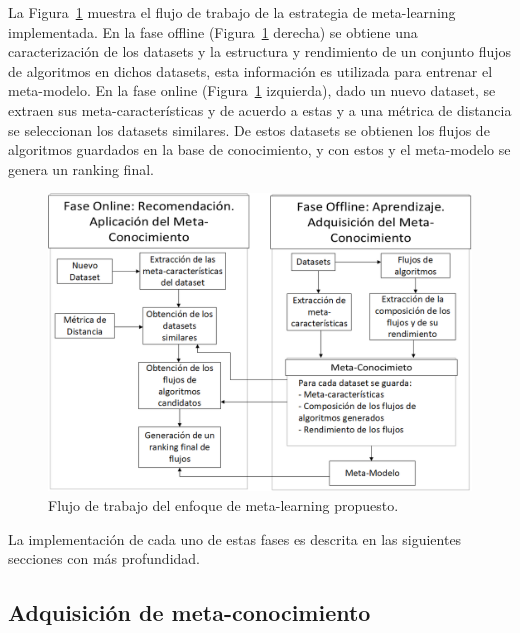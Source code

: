 La Figura~\ref{fig:system} muestra el flujo de trabajo de la estrategia de meta-learning implementada. En la fase offline (Figura~\ref{fig:system} derecha) se obtiene una caracterización de los datasets y la estructura y rendimiento de un conjunto flujos de algoritmos en dichos datasets, esta información es utilizada para entrenar el meta-modelo. En la fase online (Figura~\ref{fig:system} izquierda), dado un nuevo dataset, se extraen sus meta-características y de acuerdo a estas y a una métrica de distancia se seleccionan los datasets similares. De estos datasets se obtienen los flujos de algoritmos guardados en la base de conocimiento, y con estos y el meta-modelo se genera un ranking final.


\begin{figure}[H]
	\centering
	\includegraphics[scale=.4]{Figures/system.png}
	\caption{Flujo de trabajo del enfoque de meta-learning propuesto.}
	\label{fig:system}
\end{figure}

La implementación de cada uno de estas fases es descrita en las siguientes secciones con más profundidad.

\subsection{Adquisición de meta-conocimiento}\label{sub:adquisicion}

